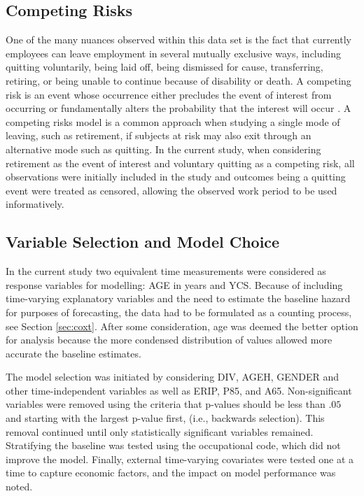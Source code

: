 
\subsection{Competing Risks}
One of the many nuances observed within this data set is the fact that currently employees can leave employment in several mutually exclusive ways, including quitting voluntarily, being laid off, being dismissed for cause, transferring, retiring, or being unable to continue because of disability or death. A competing risk is an event whose occurrence either precludes the event of interest from occurring or fundamentally alters the probability that the interest will occur \citep{tableman2003}. A competing risks model is a common approach when studying a single mode of leaving, such as retirement, if subjects at risk may also exit through an alternative mode such as quitting. In the current study, when considering retirement as the event of interest and voluntary quitting as a competing risk, all observations were initially included in the study and outcomes being a quitting event were treated as censored, allowing the observed work period to be used informatively.


\subsection{Variable Selection and Model Choice} \label{sec:modelchoice}
In the current study two equivalent time measurements were considered as response variables for modelling:  AGE in years and YCS. Because of including time-varying explanatory variables and the need to estimate the baseline hazard for purposes of forecasting, the data had to be formulated as a counting process, see Section \ref{sec:coxt}. After some consideration, age was deemed the better option for analysis because the more condensed distribution of values allowed more accurate the baseline estimates.


The model selection was initiated by considering DIV, AGEH, GENDER and other time-independent variables as well as ERIP, P85, and A65. Non-significant variables were removed using the criteria that p-values should be less than $.05$ and starting with the largest p-value first, (i.e., backwards selection). This removal continued until only statistically significant variables remained. Stratifying the baseline was tested using the occupational code, which did not improve the model. Finally, external time-varying covariates were tested one at a time to capture economic factors, and the impact on model performance was noted.

